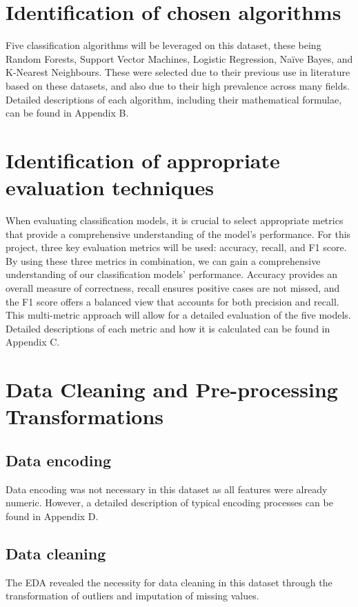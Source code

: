 \documentclass[12pt]{report}
\begin{document}
\section{Identification of chosen algorithms}\label{sec:ChosenAlgorithms}
Five classification algorithms will be leveraged on this dataset, these being Random Forests,
Support Vector Machines, Logistic Regression, Na\"ive Bayes, and K-Nearest Neighbours. These were 
selected due to their previous use in literature based on these datasets, and also due to their 
high prevalence across many fields. Detailed descriptions of each algorithm, including their 
mathematical formulae, can be found in Appendix B.

\section{Identification of appropriate evaluation techniques}\label{sec:ChosenMetrics}
When evaluating classification models, it is crucial to select appropriate metrics that provide a comprehensive understanding of the model's performance.
For this project, three key evaluation metrics will be used: accuracy, recall, and F1 score. 
By using these three metrics in combination, we can gain a comprehensive understanding of our classification models' performance. Accuracy provides an overall measure of correctness,
recall ensures positive cases are not missed, and the F1 score offers a balanced view that accounts for both precision and recall.
This multi-metric approach will allow for a detailed evaluation of the five models. Detailed descriptions 
of each metric and how it is calculated can be found in Appendix C.


\section{Data Cleaning and Pre-processing Transformations}\label{sec:Preprocessing}
\subsection{Data encoding}
Data encoding was not necessary in this dataset as all features were already numeric. However, a detailed description of typical 
encoding processes can be found in Appendix D.

\subsection{Data cleaning}
The EDA revealed the necessity for data cleaning in this dataset through the transformation of outliers and imputation of missing values.
\end{document}
